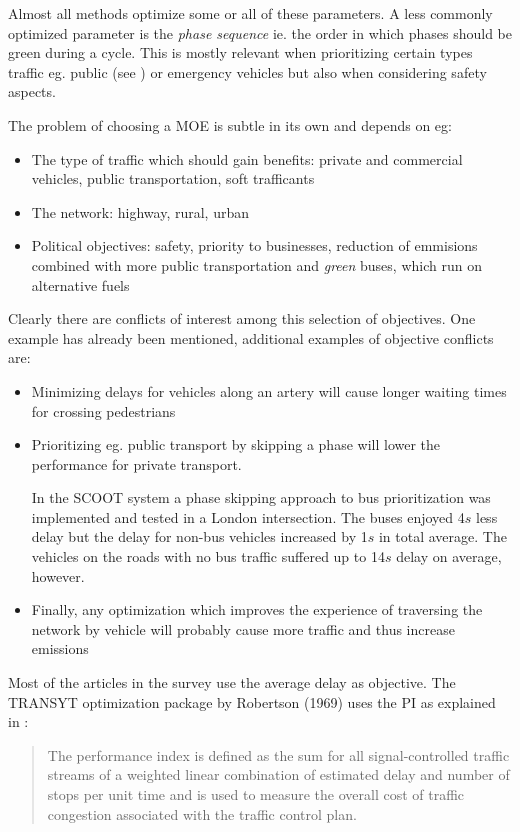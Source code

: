 Almost all methods optimize some or all of these parameters. A less commonly optimized parameter is the \textit{phase sequence} ie. the order in which phases should be green during a cycle. This is mostly relevant when prioritizing certain types traffic eg. public (see \cite{scoot2004}) or emergency vehicles but also when considering safety aspects.

The problem of choosing a MOE is subtle in its own and depends on eg:

\begin{itemize}
\item The type of traffic which should gain benefits: private and commercial vehicles, public transportation, soft trafficants
\item The network: highway, rural, urban
\item Political objectives: safety, priority to businesses, reduction of emmisions combined with more public transportation and \textit{green} buses, which run on alternative fuels
\end{itemize}

Clearly there are conflicts of interest among this selection of objectives. One example has already been mentioned, additional examples of objective conflicts are:

\begin{itemize}
\item Minimizing delays for vehicles along an artery will cause longer waiting times for crossing pedestrians
\item Prioritizing eg. public transport by skipping a phase will lower the performance for private transport. 

In the SCOOT system \cite{scoot2004} a phase skipping approach to bus prioritization was implemented and tested in a London intersection. The buses enjoyed 4$s$ less delay but the delay for non-bus vehicles increased by 1$s$ in total average. The vehicles on the roads with no bus traffic suffered up to 14$s$ delay on average, however.
\item Finally, any optimization which improves the experience of traversing the network by vehicle will probably cause more traffic and thus increase emissions
\end{itemize}

Most of the articles in the survey use the average delay as objective. The TRANSYT optimization package by Robertson (1969) uses the PI as explained in \cite{26}:

\begin{quote}
The performance index
is defined as the sum for all signal-controlled traffic streams of a
weighted linear combination of estimated delay and number
of stops per unit time and is used to measure the overall cost of
traffic congestion associated with the traffic control plan.
\end{quote}

